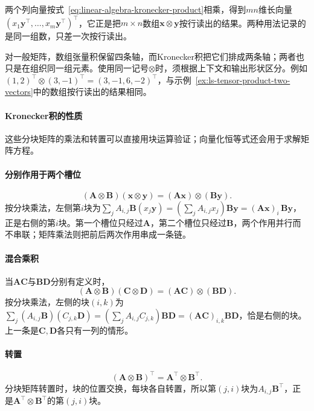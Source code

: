 两个列向量按式~\eqref{eq:linear-algebra-kronecker-product}相乘，得到$mn$维长向量$(x_1\bm y^\top,\ldots,x_m\bm y^\top)^\top$，它正是把$m\times n$数组$\bm x\otimes\bm y$按行读出的结果。两种用法记录的是同一组数，只差一次按行读出。

对一般矩阵，数组张量积保留四条轴，而Kronecker积把它们排成两条轴；两者也只是在组织同一组元素。使用同一记号$\otimes$时，须根据上下文和输出形状区分。例如$(1,2)^\top\otimes(3,-1)^\top=(3,-1,6,-2)^\top$，与示例~\ref{ex:ls-tensor-product-two-vectors}中的数组按行读出的结果相同。

\paragraph{Kronecker积的性质}
\label{sec:ls-kronecker-products}

这些分块矩阵的乘法和转置可以直接用块运算验证；向量化恒等式还会用于求解矩阵方程。

\paragraph{分别作用于两个槽位}
\[
 (\bm A\otimes\bm B)(\bm x\otimes\bm y)=(\bm A\bm x)\otimes(\bm B\bm y).
\]
按分块乘法，左侧第$i$块为$\sum_jA_{i,j}\bm B(x_j\bm y)=(\sum_jA_{i,j}x_j)\bm B\bm y=(\bm A\bm x)_i\,\bm B\bm y$，正是右侧的第$i$块。第一个槽位只经过$\bm A$，第二个槽位只经过$\bm B$，两个作用并行而不串联；矩阵乘法则把前后两次作用串成一条链。

\paragraph{混合乘积}
当$\bm A\bm C$与$\bm B\bm D$分别有定义时，
\begin{equation}
 (\bm A\otimes\bm B)(\bm C\otimes\bm D)
 =(\bm A\bm C)\otimes(\bm B\bm D).
 \label{eq:matrix-analysis-kronecker-mixed-product}
\end{equation}
按分块乘法，左侧的块$(i,k)$为$\sum_j(A_{i,j}\bm B)(C_{j,k}\bm D)=(\sum_jA_{i,j}C_{j,k})\bm B\bm D=(\bm A\bm C)_{i,k}\bm B\bm D$，恰是右侧的块。上一条是$\bm C,\bm D$各只有一列的情形。

\paragraph{转置}
\[
 (\bm A\otimes\bm B)^\top=\bm A^\top\otimes\bm B^\top.
\]
分块矩阵转置时，块的位置交换，每块各自转置，所以第$(j,i)$块为$A_{i,j}\bm B^\top$，正是$\bm A^\top\otimes\bm B^\top$的第$(j,i)$块。


